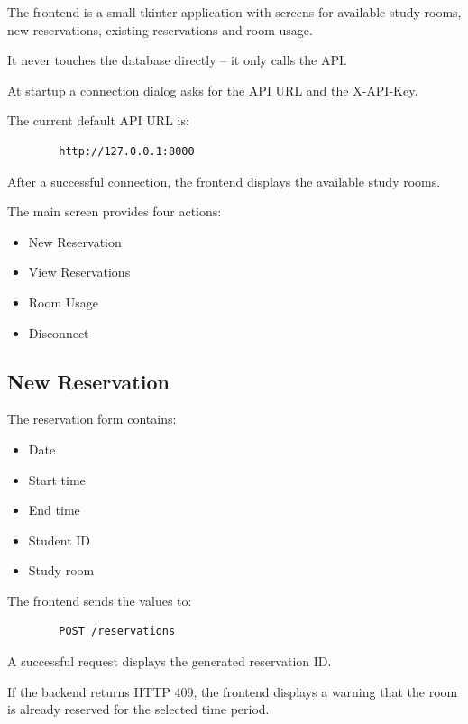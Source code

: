 \documentclass[10pt,a4paper]{article}
\begin{document}
	The frontend is a small tkinter application with screens for
	available study rooms, new reservations, existing reservations and
	room usage.
	
	It never touches the database directly -- it only calls the API.
	
	At startup a connection dialog asks for the API URL and the
	X-API-Key.
	
	The current default API URL is:
	
	\begin{lstlisting}
		http://127.0.0.1:8000
	\end{lstlisting}
	
	After a successful connection, the frontend displays the available
	study rooms.
	
	The main screen provides four actions:
	
	\begin{itemize}[leftmargin=6mm,itemsep=2pt]
		\item New Reservation
		\item View Reservations
		\item Room Usage
		\item Disconnect
	\end{itemize}
	
	\subsection*{New Reservation}
	
	The reservation form contains:
	
	\begin{itemize}[leftmargin=6mm,itemsep=2pt]
		\item Date
		\item Start time
		\item End time
		\item Student ID
		\item Study room
	\end{itemize}
	
	The frontend sends the values to:
	
	\begin{lstlisting}
		POST /reservations
	\end{lstlisting}
	
	A successful request displays the generated reservation ID.
	
	If the backend returns HTTP 409, the frontend displays a warning
	that the room is already reserved for the selected time period.
	
\end{document}
